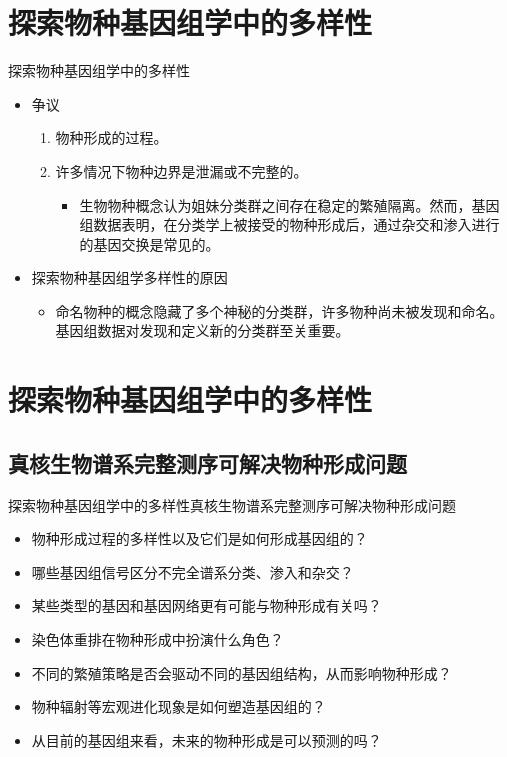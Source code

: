 \documentclass{beamer}
\begin{document}
	\section{探索物种基因组学中的多样性}
	\begin{frame}{探索物种基因组学中的多样性}
		\begin{itemize}
			\item 争议
			\begin{enumerate}
				\item 物种形成的过程。
				\item 许多情况下物种边界是泄漏或不完整的。
				\begin{itemize}
					\item 生物物种概念认为姐妹分类群之间存在稳定的繁殖隔离。然而，基因组数据表明，在分类学上被接受的物种形成后，通过杂交和渗入进行的基因交换是常见的。
				\end{itemize}
			\end{enumerate}
			\quad
			\item 探索物种基因组学多样性的原因
			\begin{itemize}
				\item 命名物种的概念隐藏了多个神秘的分类群，许多物种尚未被发现和命名。基因组数据对发现和定义新的分类群至关重要。
			\end{itemize}
		\end{itemize}
	\end{frame}


	\section{探索物种基因组学中的多样性}
	\subsection*{真核生物谱系完整测序可解决物种形成问题}
	\begin{frame}{探索物种基因组学中的多样性}{真核生物谱系完整测序可解决物种形成问题}
		\begin{itemize}
			\item 物种形成过程的多样性以及它们是如何形成基因组的？
			\item 哪些基因组信号区分不完全谱系分类、渗入和杂交？
			\item 某些类型的基因和基因网络更有可能与物种形成有关吗？
			\item 染色体重排在物种形成中扮演什么角色？
			\item 不同的繁殖策略是否会驱动不同的基因组结构，从而影响物种形成？
			\item 物种辐射等宏观进化现象是如何塑造基因组的？
			\item 从目前的基因组来看，未来的物种形成是可以预测的吗？
		\end{itemize}
	\end{frame}
\end{document}
